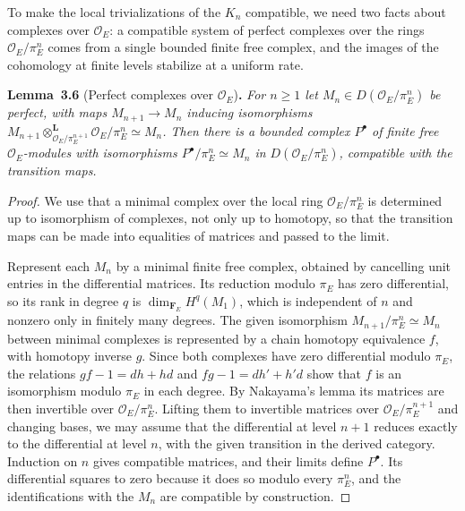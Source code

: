 \documentclass[11pt]{article}
\newenvironment{bpstatement}[2]{\par\addvspace{0.6\baselineskip}\noindent\textbf{#1}#2\textbf{.}\enspace\ignorespaces}
  {\par\addvspace{0.4\baselineskip}}
\newenvironment{bpstatementit}[2]{\begin{bpstatement}{#1}{#2}\itshape\ignorespaces}{\end{bpstatement}}
\begin{document}
\label{bp210}%
To make the local trivializations of the \(K_n\) compatible, we need two facts about complexes over \(\mathcal O_E\): a compatible system of perfect complexes over the rings \(\mathcal O_E/\pi_E^n\) comes from a single bounded finite free complex, and the images of the cohomology at finite levels stabilize at a uniform rate.

\label{bp211}%
\begin{bpstatementit}{Lemma~3.6}{ (Perfect complexes over $\mathcal O_E$)}
For \(n\ge1\) let \(M_n\in D(\mathcal O_E/\pi_E^n)\) be perfect, with maps \(M_{n+1}\to M_n\) inducing isomorphisms \(M_{n+1}\otimes^{\mathbf L}_{\mathcal O_E/\pi_E^{n+1}}\mathcal O_E/\pi_E^n\simeq M_n\). Then there is a bounded complex \(P^\bullet\) of finite free \(\mathcal O_E\)-modules with isomorphisms \(P^\bullet/\pi_E^n\simeq M_n\) in \(D(\mathcal O_E/\pi_E^n)\), compatible with the transition maps.
\end{bpstatementit}

\begin{proof}[{Proof}]\label{bp212}%
We use that a minimal complex over the local ring \(\mathcal O_E/\pi_E^n\) is determined up to isomorphism of complexes, not only up to homotopy, so that the transition maps can be made into equalities of matrices and passed to the limit.

Represent each \(M_n\) by a minimal finite free complex, obtained by cancelling unit entries in the differential matrices. Its reduction modulo \(\pi_E\) has zero differential, so its rank in degree \(q\) is \(\dim_{\mathbf F_E}H^q(M_1)\), which is independent of \(n\) and nonzero only in finitely many degrees. The given isomorphism \(M_{n+1}/\pi_E^n\simeq M_n\) between minimal complexes is represented by a chain homotopy equivalence \(f\), with homotopy inverse \(g\). Since both complexes have zero differential modulo \(\pi_E\), the relations \(gf-1=dh+hd\) and \(fg-1=dh'+h'd\) show that \(f\) is an isomorphism modulo \(\pi_E\) in each degree. By Nakayama's lemma its matrices are then invertible over \(\mathcal O_E/\pi_E^n\). Lifting them to invertible matrices over \(\mathcal O_E/\pi_E^{n+1}\) and changing bases, we may assume that the differential at level \(n+1\) reduces exactly to the differential at level \(n\), with the given transition in the derived category. Induction on \(n\) gives compatible matrices, and their limits define \(P^\bullet\). Its differential squares to zero because it does so modulo every \(\pi_E^n\), and the identifications with the \(M_n\) are compatible by construction.
\end{proof}
\end{document}
